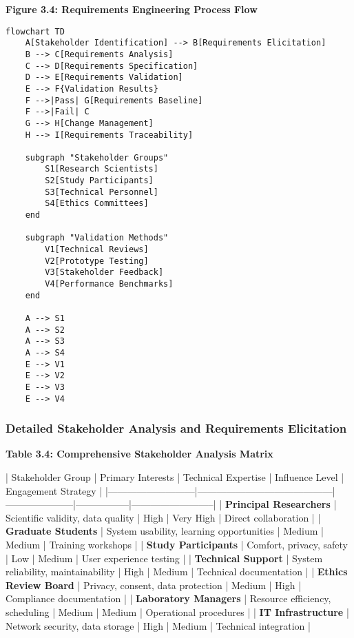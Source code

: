 \documentclass[12pt,a4paper]{report}
\begin{document}
\textbf{Figure 3.4: Requirements Engineering Process Flow}

\begin{verbatim}
flowchart TD
    A[Stakeholder Identification] --> B[Requirements Elicitation]
    B --> C[Requirements Analysis]
    C --> D[Requirements Specification]
    D --> E[Requirements Validation]
    E --> F{Validation Results}
    F -->|Pass| G[Requirements Baseline]
    F -->|Fail| C
    G --> H[Change Management]
    H --> I[Requirements Traceability]

    subgraph "Stakeholder Groups"
        S1[Research Scientists]
        S2[Study Participants]
        S3[Technical Personnel]
        S4[Ethics Committees]
    end

    subgraph "Validation Methods"
        V1[Technical Reviews]
        V2[Prototype Testing]
        V3[Stakeholder Feedback]
        V4[Performance Benchmarks]
    end

    A --> S1
    A --> S2
    A --> S3
    A --> S4
    E --> V1
    E --> V2
    E --> V3
    E --> V4
\end{verbatim}

\subsubsection{Detailed Stakeholder Analysis and Requirements Elicitation}

\textbf{Table 3.4: Comprehensive Stakeholder Analysis Matrix}

| Stakeholder Group         | Primary Interests                        | Technical Expertise | Influence Level | Engagement Strategy      |
|---------------------------|------------------------------------------|---------------------|-----------------|--------------------------|
| \textbf{Principal Researchers} | Scientific validity, data quality        | High                | Very High       | Direct collaboration     |
| \textbf{Graduate Students}     | System usability, learning opportunities | Medium              | Medium          | Training workshops       |
| \textbf{Study Participants}    | Comfort, privacy, safety                 | Low                 | Medium          | User experience testing  |
| \textbf{Technical Support}     | System reliability, maintainability      | High                | Medium          | Technical documentation  |
| \textbf{Ethics Review Board}   | Privacy, consent, data protection        | Medium              | High            | Compliance documentation |
| \textbf{Laboratory Managers}   | Resource efficiency, scheduling          | Medium              | Medium          | Operational procedures   |
| \textbf{IT Infrastructure}     | Network security, data storage           | High                | Medium          | Technical integration    |
\end{document}
